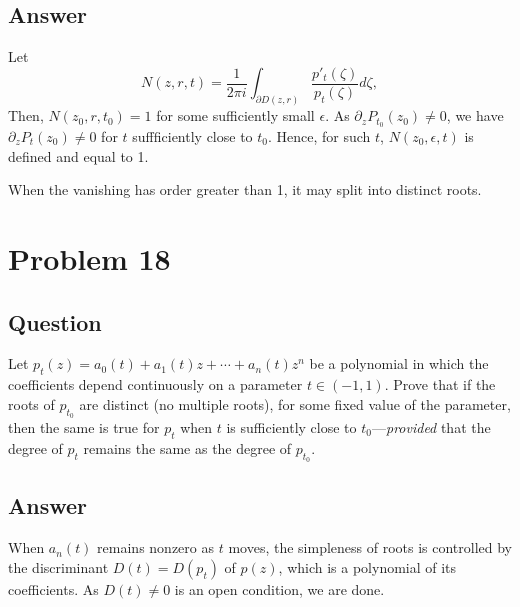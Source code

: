 \documentclass[11pt]{article}
\begin{document}
\subsection{Answer}
Let 
\[N(z,r,t) = \frac{1}{2 \pi i} \int_{\partial D(z,r)} \frac{p'_t(\zeta)}{p_t(\zeta)} d \zeta,\]
Then, $N(z_0, r, t_0)=1$ for some sufficiently small $\epsilon$. As $\partial_zP_{t_0}(z_0) \neq 0$, we have $\partial_zP_t(z_0)\neq 0$ for $t$ suffficiently close to $t_0$. Hence, for such $t$, $N(z_0,\epsilon, t)$ is defined and equal to 1.

When the vanishing has order greater than 1, it may split into distinct roots. 
\section{Problem 18}
\subsection{Question}
Let $p_t(z) = a_0(t) + a_1(t)z+ \cdots + a_n(t) z^n$ be a polynomial in which the coefficients depend continuously on a parameter $t \in (-1,1)$. Prove that if the roots of $p_{t_0}$ are distinct (no multiple roots), for some fixed value of the parameter, then the same is true for $p_t$ when $t$ is sufficiently close to $t_0$---\emph{provided} that the degree of $p_t$ remains the same as the degree of $p_{t_0}$.
\subsection{Answer}
When $a_n(t)$ remains nonzero as $t$ moves, the simpleness of roots is controlled by the discriminant $D(t) = D(p_t)$ of $p(z)$, which is a polynomial of its coefficients. As $D(t) \neq 0$ is an open condition, we are done.
\end{document}

